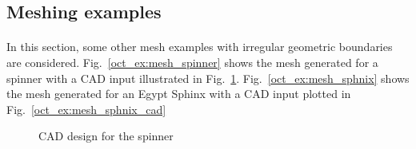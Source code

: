 \subsection{Meshing examples}
\paragraph{}
In this section, some other mesh examples with irregular geometric boundaries are considered.
Fig.~\ref{oct_ex:mesh_spinner} shows the mesh generated for a spinner with a CAD input illustrated in Fig.~\ref{oct_ex:mesh_spinner_cad}.
Fig.~\ref{oct_ex:mesh_sphnix} shows the mesh generated for an Egypt Sphinx with a CAD input plotted in Fig.~\ref{oct_ex:mesh_sphnix_cad}

\begin{figure}
    \centering
    \caption[CAD design for spinner]{CAD design for the spinner}
    \label{oct_ex:mesh_spinner_cad}
\end{figure}


